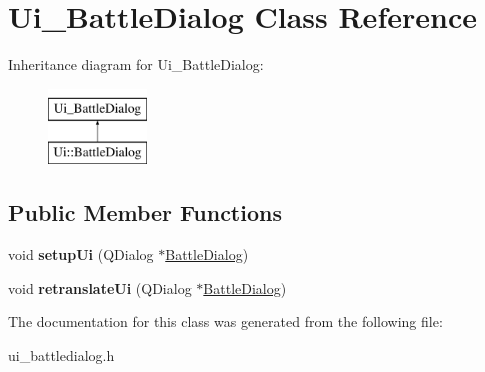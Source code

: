 \hypertarget{class_ui___battle_dialog}{}\section{Ui\+\_\+\+Battle\+Dialog Class Reference}
\label{class_ui___battle_dialog}
Inheritance diagram for Ui\+\_\+\+Battle\+Dialog\+:\begin{figure}[H]
\begin{center}
\leavevmode
\includegraphics[height=2.000000cm]{class_ui___battle_dialog}
\end{center}
\end{figure}
\subsection*{Public Member Functions}
\begin{DoxyCompactItemize}
\item 
\mbox{\label{class_ui___battle_dialog_a47d2abc875c2881b4889707e3d30701d}} 
void {\bfseries setup\+Ui} (Q\+Dialog $\ast$\hyperlink{class_battle_dialog}{Battle\+Dialog})
\item 
\mbox{\label{class_ui___battle_dialog_a63d360f0f0a813f1c9119208281e7fb1}} 
void {\bfseries retranslate\+Ui} (Q\+Dialog $\ast$\hyperlink{class_battle_dialog}{Battle\+Dialog})
\end{DoxyCompactItemize}


The documentation for this class was generated from the following file\+:\begin{DoxyCompactItemize}
\item 
ui\+\_\+battledialog.\+h\end{DoxyCompactItemize}
